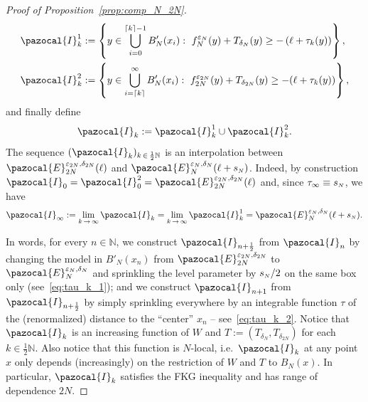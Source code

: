 \documentclass[AHL,Unicode,longabstracts,published]{cedram}
\newcommand{\N}{\mathbb{N}}
\newcommand{\si}[1]{{\mathchoice{}{}{\scriptscriptstyle}{}#1}}
\newcommand{\sN}{{\mathchoice{}{}{\scriptscriptstyle}{}N}}
\begin{document}
\begin{proof}[Proof of Proposition~\ref{prop:comp_N_2N}]
\begin{align}
\pazocal{I}^1_k &:= \left\{y\in\bigcup_{i=0}^{\lceil k\rceil-1} B'_N(x_i):~f_N^{\varepsilon_{N}}(y)+T_{\delta_{N}}(y)\geq -\left(\ell+\tau_k(y)\right)\right\},\label{eq:I_1}\\
\pazocal{I}^2_k &:=\left\{y\in\bigcup_{i=\lceil k\rceil}^{\infty} B'_N(x_i):~f_{2N}^{\varepsilon_{2N}}(y)+T_{\delta_{2N}}(y)\geq -(\ell+\tau_k(y))\right\},\label{eq:I_2}
\end{align}
and finally define
\begin{equation}\label{eq:I}
\pazocal{I}_k := \pazocal{I}^1_k\cup \pazocal{I}^2_k.
\end{equation}
The sequence $(\pazocal{I}_k)_{k\,\in\,\frac12 \N}$ is an interpolation between $\pazocal{E}_{2N}^{\varepsilon_{\si{2N}},\delta_{\si{2N}}}(\ell)$ and $\pazocal{E}_{N}^{\varepsilon_{\sN}, \delta_{\sN}}(\ell+s_{\sN})$. Indeed, by construction $\pazocal{I}_0=\pazocal{I}_0^2=\pazocal{E}_{2N}^{\varepsilon_{\si{2N}},\delta_{\si{2N}}}(\ell)$ and, since $\tau_{\infty}\equiv s_{\sN}$, we have
\begin{equation}
\pazocal{I}_\infty:=\lim_{k\,\to\,\infty} \pazocal{I}_k = \lim_{k\,\to\,\infty} \pazocal{I}_k^1 = \pazocal{E}_{N}^{\varepsilon_{\sN}, \delta_{\sN}}(\ell+s_{\sN}).
\end{equation}

In words, for every $n\in\N$, we construct $\pazocal{I}_{n+\frac12}$ from $\pazocal{I}_n$ by changing the model in $B'_N(x_n)$ from $\pazocal{E}_{2N}^{\varepsilon_{\si{2N}}, \delta_{\si{2N}}}$ to $\pazocal{E}_{N}^{\varepsilon_{\sN}, \delta_{\sN}}$ and sprinkling the level parameter by $s_{\sN}/2$ on the same box only (see~\eqref{eq:tau_k_1}); and we construct $\pazocal{I}_{n+1}$ from $\pazocal{I}_{n+\frac12}$ by simply sprinkling everywhere by an integrable function $\tau$ of the (renormalized) distance to the ``center'' $x_n$ -- see~\eqref{eq:tau_k_2}. Notice that $\pazocal{I}_k$ is an increasing function of $W$ and $T:=(T_{\delta_N},T_{\delta_{2N}})$ for each $k\in\tfrac12\N$. Also notice that this function is $N$-local, i.e.~$\pazocal{I}_k$ at any point $x$ only depends (increasingly) on the restriction of $W$ and $T$ to $B_N(x)$. In particular, $\pazocal{I}_k$ satisfies the FKG inequality and has range of dependence $2N$.


\end{proof}
\end{document}
